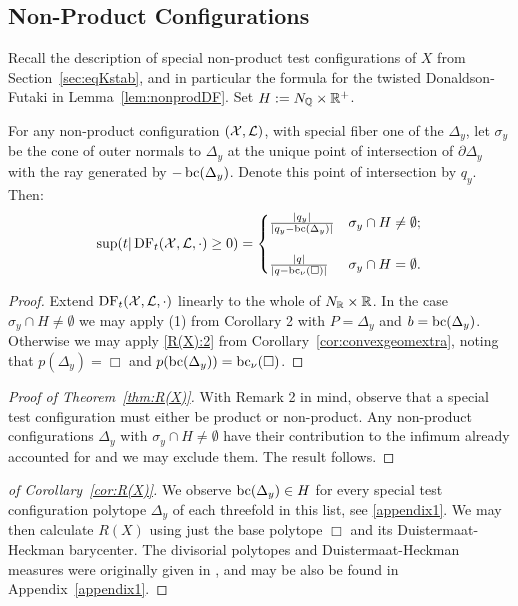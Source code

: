 \subsection{Non-Product Configurations}
Recall the description of special non-product test configurations of \(X\) from Section~\ref{sec:eqKstab}, and in particular the formula for the twisted Donaldson-Futaki in Lemma~\ref{lem:nonprodDF}. Set \(H := N_{\mathbb{Q}} \times \mathbb{R}^+\).
\begin{proposition}
For any non-product configuration \(({\mathcal{X}},\mathcal{L})\), with special fiber one of the \(\Delta_y\), let \(\sigma_y\) be the cone of outer normals to \(\Delta_y\) at the unique point of intersection of \(\partial \Delta_y\) with the ray generated by \(-\mathop{\rm bc}\nolimits(\Delta_y)\). Denote this point of intersection by \(q_y\). Then:
\[
\sup(t | \mathop{\rm DF}\nolimits_t({\mathcal{X}},\mathcal{L},\cdot) \ge 0) =\begin{cases} 
     \frac{|q_y|}{|q_y - \mathop{\rm bc}\nolimits(\Delta_y)|} & \sigma_y \cap H \neq \emptyset ;\\ \\
      \frac{|q|}{|q-\mathop{\rm bc}\nolimits_\nu(\Box)|} & \sigma_y \cap H = \emptyset.
   \end{cases}
\]
\end{proposition}
\begin{proof}
Extend \(\mathop{\rm DF}\nolimits_t({\mathcal{X}},\mathcal{L},\cdot)\) linearly to the whole of \(N_{\mathbb{R}} \times \mathbb{R}\). In the case \(\sigma_y \cap H \neq \emptyset\) we may apply (1) from Corollary 2 with \(P = \Delta_y\) and \(b = \mathop{\rm bc}\nolimits(\Delta_y)\). Otherwise we may apply \normalfont{(}\ref{R(X):2}\normalfont{)} from Corollary~\ref{cor:convexgeomextra}, noting that \(p(\Delta_y) = \Box\) and \(p(\mathop{\rm bc}\nolimits(\Delta_y)) = \mathop{\rm bc}\nolimits_\nu( \Box)\).
\end{proof}
\begin{proof}[Proof of Theorem~\ref{thm:R(X)}]
With Remark 2 in mind, observe that a special test configuration must either be product or non-product. Any non-product configurations \(\Delta_y\) with \(\sigma_y \cap H \neq \emptyset\) have their contribution to the infimum already accounted for and we may exclude them. The result follows.
\end{proof}
\begin{proof}[of Corollary~\ref{cor:R(X)}]
We observe \(\mathop{\rm bc}\nolimits(\Delta_y) \in H \) for every special test configuration polytope \(\Delta_y\) of each threefold in this list, see \ref{appendix1}.  We may then calculate \(R(X)\) using just the base polytope \(\Box\) and its Duistermaat-Heckman barycenter. The divisorial polytopes and Duistermaat-Heckman measures were originally given in \cite{suss2013fano}, and may be also be found in Appendix~\ref{appendix1}.
\end{proof}